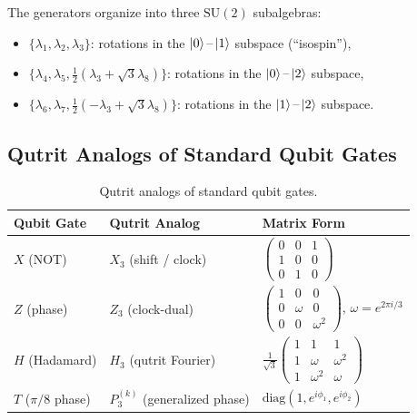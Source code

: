 \documentclass[11pt,letterpaper]{article}
\newcommand{\SU}{\mathrm{SU}}
\begin{document}
The generators organize into three $\SU(2)$ subalgebras:
\begin{itemize}
  \item $\{\lambda_1, \lambda_2, \lambda_3\}$: rotations in the $\ket{0}\text{--}\ket{1}$ subspace (``isospin''),
  \item $\{\lambda_4, \lambda_5, \frac{1}{2}(\lambda_3 + \sqrt{3}\lambda_8)\}$: rotations in the $\ket{0}\text{--}\ket{2}$ subspace,
  \item $\{\lambda_6, \lambda_7, \frac{1}{2}(-\lambda_3 + \sqrt{3}\lambda_8)\}$: rotations in the $\ket{1}\text{--}\ket{2}$ subspace.
\end{itemize}

\subsection{Qutrit Analogs of Standard Qubit Gates}

\begin{table}[h]
\centering
\caption{Qutrit analogs of standard qubit gates.}
\label{tab:qutritgates}
\begin{tabular}{@{}lll@{}}
\toprule
\textbf{Qubit Gate} & \textbf{Qutrit Analog} & \textbf{Matrix Form} \\
\midrule
$X$ (NOT) & $X_3$ (shift / clock) &
$\left(\begin{smallmatrix} 0 & 0 & 1 \\ 1 & 0 & 0 \\ 0 & 1 & 0 \end{smallmatrix}\right)$ \\[6pt]
$Z$ (phase) & $Z_3$ (clock-dual) &
$\left(\begin{smallmatrix} 1 & 0 & 0 \\ 0 & \omega & 0 \\ 0 & 0 & \omega^2 \end{smallmatrix}\right)$, $\omega = e^{2\pi i/3}$ \\[6pt]
$H$ (Hadamard) & $H_3$ (qutrit Fourier) &
$\frac{1}{\sqrt{3}}\left(\begin{smallmatrix} 1 & 1 & 1 \\ 1 & \omega & \omega^2 \\ 1 & \omega^2 & \omega \end{smallmatrix}\right)$ \\[6pt]
$T$ ($\pi/8$ phase) & $P_3^{(k)}$ (generalized phase) &
$\text{diag}(1, e^{i\phi_1}, e^{i\phi_2})$ \\
\bottomrule
\end{tabular}
\end{table}
\end{document}
